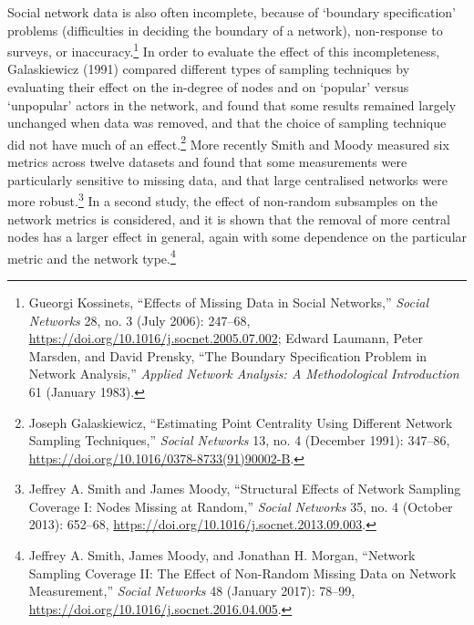 \documentclass[]{article}
\begin{document}
Social network data is also often incomplete, because of `boundary specification' problems (difficulties in deciding the boundary of a network), non-response to surveys, or inaccuracy.\footnote{Gueorgi Kossinets, ``Effects of Missing Data in Social Networks,'' \emph{Social Networks} 28, no. 3 (July 2006): 247--68, \url{https://doi.org/10.1016/j.socnet.2005.07.002}; Edward Laumann, Peter Marsden, and David Prensky, ``The Boundary Specification Problem in Network Analysis,'' \emph{Applied Network Analysis: A Methodological Introduction} 61 (January 1983).} In order to evaluate the effect of this incompleteness, Galaskiewicz (1991) compared different types of sampling techniques by evaluating their effect on the in-degree of nodes and on `popular' versus `unpopular' actors in the network, and found that some results remained largely unchanged when data was removed, and that the choice of sampling technique did not have much of an effect.\footnote{Joseph Galaskiewicz, ``Estimating Point Centrality Using Different Network Sampling Techniques,'' \emph{Social Networks} 13, no. 4 (December 1991): 347--86, \url{https://doi.org/10.1016/0378-8733(91)90002-B}.} More recently Smith and Moody measured six metrics across twelve datasets and found that some measurements were particularly sensitive to missing data, and that large centralised networks were more robust.\footnote{Jeffrey A. Smith and James Moody, ``Structural Effects of Network Sampling Coverage I: Nodes Missing at Random,'' \emph{Social Networks} 35, no. 4 (October 2013): 652--68, \url{https://doi.org/10.1016/j.socnet.2013.09.003}.} In a second study, the effect of non-random subsamples on the network metrics is considered, and it is shown that the removal of more central nodes has a larger effect in general, again with some dependence on the particular metric and the network type.\footnote{Jeffrey A. Smith, James Moody, and Jonathan H. Morgan, ``Network Sampling Coverage II: The Effect of Non-Random Missing Data on Network Measurement,'' \emph{Social Networks} 48 (January 2017): 78--99, \url{https://doi.org/10.1016/j.socnet.2016.04.005}.}
\end{document}
